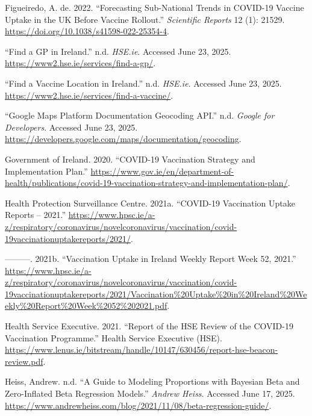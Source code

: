 \documentclass{article}
\newlength{\cslhangindent}
\newenvironment{CSLReferences}[2] %
 {\begin{list}{}{%
  \setlength{\itemindent}{0pt}
  \setlength{\leftmargin}{0pt}
  \setlength{\parsep}{0pt}
  \ifodd #1
   \setlength{\leftmargin}{\cslhangindent}
   \setlength{\itemindent}{-1\cslhangindent}
  \fi
  \setlength{\itemsep}{#2\baselineskip}}}
 {\end{list}}
\begin{document}
\begin{CSLReferences}{1}{0}
Figueiredo, A. de. 2022. {``Forecasting Sub-National Trends in COVID-19
Vaccine Uptake in the UK Before Vaccine Rollout.''} \emph{Scientific
Reports} 12 (1): 21529.
\url{https://doi.org/10.1038/s41598-022-25354-4}.

{``Find a {GP} in {Ireland}.''} n.d. \emph{HSE.ie}. Accessed June 23,
2025. \url{https://www2.hse.ie/services/find-a-gp/}.

{``Find a Vaccine Location in {Ireland}.''} n.d. \emph{HSE.ie}. Accessed
June 23, 2025. \url{https://www2.hse.ie/services/find-a-vaccine/}.

{``Google {Maps} {Platform} {Documentation} {\textbar} {Geocoding}
{API}.''} n.d. \emph{Google for Developers}. Accessed June 23, 2025.
\url{https://developers.google.com/maps/documentation/geocoding}.

Government of Ireland. 2020. {``COVID-19 Vaccination Strategy and
Implementation Plan.''}
\url{https://www.gov.ie/en/department-of-health/publications/covid-19-vaccination-strategy-and-implementation-plan/}.

Health Protection Surveillance Centre. 2021a. {``COVID-19 Vaccination
Uptake Reports -- 2021.''}
\url{https://www.hpsc.ie/a-z/respiratory/coronavirus/novelcoronavirus/vaccination/covid-19vaccinationuptakereports/2021/}.

---------. 2021b. {``Vaccination Uptake in Ireland Weekly Report Week
52, 2021.''}
\url{https://www.hpsc.ie/a-z/respiratory/coronavirus/novelcoronavirus/vaccination/covid-19vaccinationuptakereports/2021/Vaccination\%20Uptake\%20in\%20Ireland\%20Weekly\%20Report\%20Week\%2052\%202021.pdf}.

Health Service Executive. 2021. {``Report of the HSE Review of the
COVID-19 Vaccination Programme.''} Health Service Executive (HSE).
\url{https://www.lenus.ie/bitstream/handle/10147/630456/report-hse-beacon-review.pdf}.

Heiss, Andrew. n.d. {``A Guide to Modeling Proportions with {Bayesian}
Beta and Zero-Inflated Beta Regression Models.''} \emph{Andrew Heiss}.
Accessed June 17, 2025.
\url{https://www.andrewheiss.com/blog/2021/11/08/beta-regression-guide/}.


\end{CSLReferences}
\end{document}
